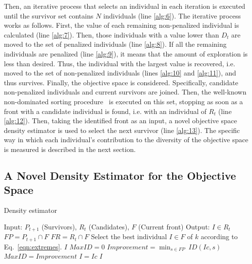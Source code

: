 Then, an iterative process that selects an individual in each iteration is executed until the survivor
set contains $N$ individuals (line \ref{alg:6}).
%
The iterative process works as follows.
%
First, the \DCS{} value of each remaining non-penalized individual is calculated (line \ref{alg:7}).
%
Then, those individuals with a \DCS{} value lower than $D_t$ are moved to the set of penalized individuals (line \ref{alg:8}).
%
If all the remaining individuals are penalized (line \ref{alg:9}), it means that the amount of exploration is less than desired.
%
Thus, the individual with the largest \DCS{} value is recovered, i.e. moved to the set of non-penalized individuals (lines \ref{alg:10} and \ref{alg:11}), and thus survives.
%
Finally, the objective space is considered.
%
Specifically, candidate non-penalized individuals and current survivors are joined.
%
Then, the well-known non-dominated sorting procedure~\cite{Joel:NSGAII} is executed on this set, stopping as soon as a front with 
a candidate individual is found, i.e. with an individual of $R_t$ (line \ref{alg:12}).
%
Then, taking the identified front as an input, a novel objective space density estimator is used to select
the next survivor (line \ref{alg:13}).
%
The specific way in which each individual's contribution to the diversity of the objective space is measured is described in the next section.
%

\subsection{A Novel Density Estimator for the Objective Space}
\label{subsection:density}

\begin{algorithm}[t]
	\caption{Density estimator} 
\begin{small}
\begin{algorithmic}[1]
\STATE Input: $P_{t+1}$ (Survivors), $R_t$ (Candidates), $F$ (Current front)
    	\STATE Output: $I \in R_t$ 
	\STATE $FP = P_{t+1} \cap F$ \label{alg:FP}
	\STATE $FR = R_{t} \cap F$ \label{alg:FR}
        \label{alg:density_for}
	      \STATE Select the best individual $I \in F$ of $k$ according to Eq.~\ref{eqn:extremes}.\label{alg:density_1}
	  	 \RETURN $I$ \label{alg:density_2}
	  	\ENDIF
	\ENDFOR\label{alg:density_endfor}
	\STATE $MaxID = 0$ \label{alg:density_for2}
	\STATE $Improvement = \displaystyle{\min_{s \in FP}\ ID(Ic, s)}$ 
	 \label{alg:density_if2}
	   \STATE $MaxID = Improvement$
	   \STATE $I = Ic$ 
	\ENDIF \label{alg:density_endif2}
	\ENDFOR	\label{alg:density_endfor2}
    	\RETURN $I$ \label{alg:density_4}
	\end{algorithmic}
\end{small}
\label{alg:Density_Estimator}
\end{algorithm}

